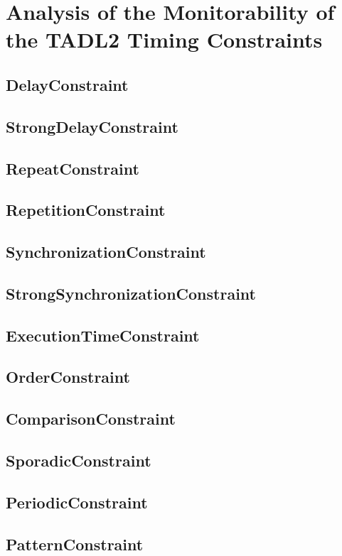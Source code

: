 \chapter{Analysis of the Monitorability of the TADL2 Timing Constraints}
\label{chapter-TADL2}

\section{DelayConstraint}
\section{StrongDelayConstraint}
\section{RepeatConstraint}
\section{RepetitionConstraint}
\section{SynchronizationConstraint}
\section{StrongSynchronizationConstraint}
\section{ExecutionTimeConstraint}
\section{OrderConstraint}
\section{ComparisonConstraint}
\section{SporadicConstraint}
\section{PeriodicConstraint}
\section{PatternConstraint}
